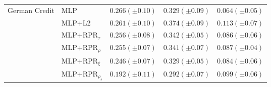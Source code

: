 \begin{tabular}{lllll}
\multirow[t]{6}{*}{German Credit} & MLP & $0.266 (\pm0.10)$ & $0.329 (\pm0.09)$ & $0.064 (\pm0.05)$ \\
 & MLP+L2 & $0.261 (\pm0.10)$ & $0.374 (\pm0.09)$ & $0.113 (\pm0.07)$ \\
 & MLP+RPR$_{\tau}$ & $0.256 (\pm0.08)$ & $0.342 (\pm0.05)$ & $0.086 (\pm0.06)$ \\
 & MLP+RPR$_{\rho}$ & $0.255 (\pm0.07)$ & $0.341 (\pm0.07)$ & $0.087 (\pm0.04)$ \\
 & MLP+RPR$_{\xi}$ & $0.246 (\pm0.07)$ & $0.329 (\pm0.05)$ & $0.084 (\pm0.06)$ \\
 & MLP+RPR$_{\rho_s}$ & $0.192 (\pm0.11)$ & $0.292 (\pm0.07)$ & $0.099 (\pm0.06)$ \\
\cline{1-5}
\bottomrule
\end{tabular}
